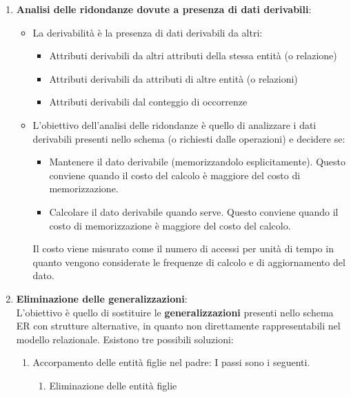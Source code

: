 \documentclass[a4paper,twoside]{article}
\begin{document}
\begin{enumerate}
  \item \textbf{Analisi delle ridondanze dovute a presenza di dati derivabili}:
    \begin{itemize}
      \item 
        La derivabilità è la presenza di dati derivabili da altri:
        \begin{itemize}
          \item Attributi derivabili da altri attributi della stessa entità (o relazione)
          \item Attributi derivabili da attributi di altre entità (o relazioni)
          \item Attributi derivabili dal conteggio di occorrenze
        \end{itemize}

      \item 
        L'obiettivo dell'analisi delle ridondanze è quello di analizzare i dati derivabili
        presenti nello schema (o richiesti dalle operazioni) e decidere se:
        \begin{itemize}
          \item Mantenere il dato derivabile (memorizzandolo esplicitamente). Questo
            conviene quando il costo del calcolo è maggiore del costo di memorizzazione.
          \item Calcolare il dato derivabile quando serve. Questo conviene quando il costo di
            memorizzazione è maggiore del costo del calcolo.
        \end{itemize}
        Il costo viene misurato come il numero di accessi per unità di tempo in quanto
        vengono considerate le frequenze di calcolo e di aggiornamento del dato.
    \end{itemize}

  \item \textbf{Eliminazione delle generalizzazioni}:\\
    L'obiettivo è quello di sostituire le \textbf{generalizzazioni} presenti nello schema
    ER con strutture alternative, in quanto non direttamente rappresentabili nel
    modello relazionale. Esistono tre possibili soluzioni:
    \begin{enumerate}
      \item Accorpamento delle entità figlie nel padre: I passi sono i seguenti.
        \begin{enumerate}
          \item Eliminazione delle entità figlie


\end{enumerate}
\end{enumerate}
\end{enumerate}
\end{document}
